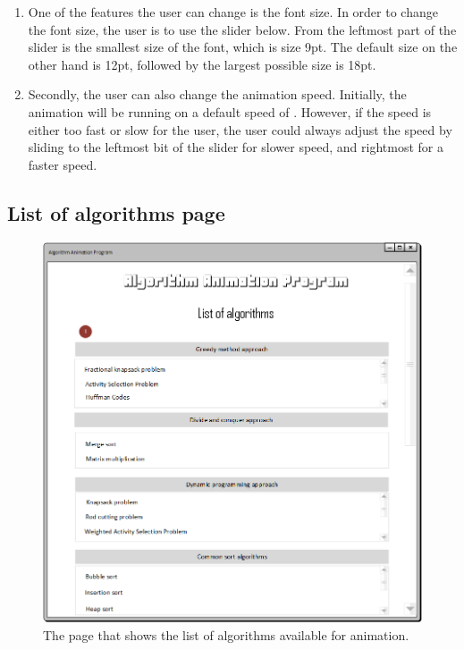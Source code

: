 \begin{enumerate}
\item One of the features the user can change is the font size. In order to change the font size, the user is to use the slider below. From the leftmost part of the slider is the smallest size of the font, which is size 9pt. The default size on the other hand is 12pt, followed by the largest possible size is 18pt. 
\item Secondly, the user can also change the animation speed. Initially, the animation will be running on a default speed of . However, if the speed is either too fast or slow for the user, the user could always adjust the speed by sliding to the leftmost bit of the slider for slower speed, and rightmost for a faster speed.
\end{enumerate}

\subsection{List of algorithms page}

\begin{figure}[H]
\centering
\hspace*{-0.5cm}
\includegraphics[scale=0.8]{images/report_images/uiListOfAlgorithms.png}
\caption{The page that shows the list of algorithms available for animation.}
\label{uiListOfAlgorithms}
\end{figure}

